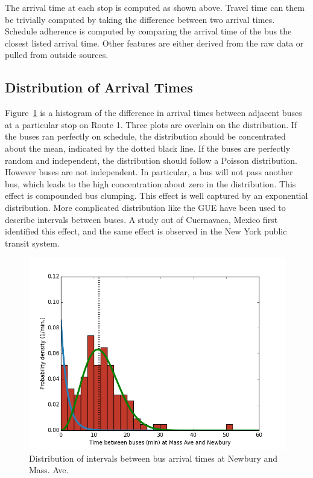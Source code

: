 The arrival time at each stop is computed as shown above.
Travel time can them be trivially computed by taking the difference between two arrival times.
Schedule adherence is computed by comparing the arrival time of the bus the closest listed arrival time.
Other features are either derived from the raw data or pulled from outside sources.

\subsection{Distribution of Arrival Times}

Figure~\ref{dist} is a histogram of the difference in arrival times between adjacent buses at a particular stop on Route 1.
Three plots are overlain on the distribution.
If the buses ran perfectly on schedule, the distribution should be concentrated about the mean, indicated by the dotted black line.
If the buses are perfectly random and independent, the distribution should follow a Poisson distribution.
However buses are not independent.
In particular, a bus will not pass another bus, which leads to the high concentration about zero in the distribution.
This effect is compounded bus clumping.
This effect is well captured by an exponential distribution.
More complicated distribution like the GUE have been used to describe intervals between buses.
A study out of Cuernavaca, Mexico \cite{baik2006model} first identified this effect, and the same effect is observed in the New York public transit system.

\begin{figure}
\includegraphics[width=\linewidth]{images/dist.png}
\caption{Distribution of intervals between bus arrival times at Newbury and Mass. Ave.}
\label{dist}
\end{figure}

